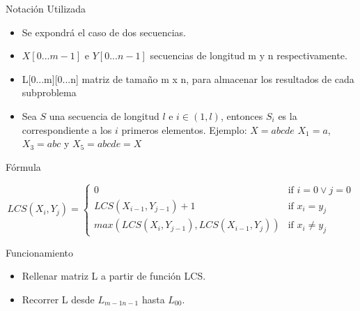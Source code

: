 \documentclass{beamer}
\begin{document}
			
				\begin{frame}{Notación Utilizada}
 			
					\begin{itemize}
			
						\item Se expondrá el caso de dos secuencias.

						\item $X[0...m-1]$ e $Y[0...n-1]$  secuencias de longitud m y n respectivamente. 	
				
						\item L[0...m][0...n] matriz de tamaño m x n, para almacenar los resultados de cada subproblema
  					
						\item Sea $S$ una secuencia de longitud $l$  e $i \in (1, l)$, entonces $S_{i}$ es la correspondiente a los $i$ primeros elementos. 
			\newline{}
			Ejemplo: $X = abcde$
			\newline{}
			$X_{1} = a$, $X_{3} = abc$ y $X_{5} = abcde = X$
					\end{itemize}
			
				\end{frame}			

			
				\begin{frame}{Fórmula}
 			
					\[
			 		LCS( X_{i}, Y_{j} ) =
						\begin{cases}
				    			0									& \text{if } i = 0 \vee	 j = 0\\
    							LCS( X_{i-1}, Y_{j-1}) + 1					& \text{if } x_{i} = y_{j}\\
    							max(LCS( X_{i}, Y_{j-1}), LCS( X_{i-1}, Y_{j}))	& \text{if } x_{i} \not = y_{j}
						\end{cases}
					\]
			
				\end{frame}

				\begin{frame}{Funcionamiento}
 			
					\begin{itemize}
			
						\item Rellenar matriz L a partir de función LCS.
				
						\item Recorrer L desde $L_{m-1n-1}$ hasta $L_{00}$.
  					
					\end{itemize}	
					
				\end{frame}
				
\end{document}
